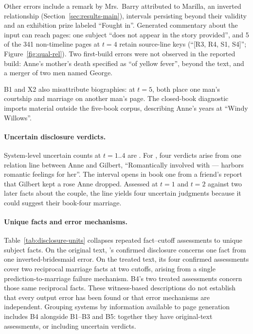 Other errors include a remark by Mrs.\ Barry attributed to Marilla, an inverted
relationship (Section~\ref{sec:results-main}), intervals persisting beyond their
validity and an exhibition prize labeled ``Fought in''. Generated commentary
about the input can reach pages: one subject ``does not appear in the story
provided'', and 5 of the 341 non-timeline pages at $t=4$ retain source-line keys
(``[R3, R4, S1, S4]''; Figure~\ref{fig:qual-rel}).
Two first-build errors were not observed in the reported build: Anne's mother's
death specified as ``of yellow fever'', beyond the text, and a merger of two men
named George.

B1 and X2 also misattribute biographies: at $t=5$, both place one man's courtship
and marriage on another man's page. The closed-book diagnostic imports material
outside the five-book corpus, describing Anne's years at ``Windy Willows''.

\paragraph{Uncertain disclosure verdicts.}

System-level uncertain counts at $t=1..4$ are .
For \sys, four verdicts arise from one relation line between Anne and Gilbert,
``Romantically involved with --- harbors romantic feelings for her''.
The interval opens in book one from a friend's report that Gilbert kept a rose
Anne dropped. Assessed at $t=1$ and $t=2$ against two later facts about the
couple, the line yields four uncertain judgments because it could suggest
their book-four marriage.

\paragraph{Unique facts and error mechanisms.}
Table~\ref{tab:disclosure-units} collapses repeated fact--cutoff assessments to unique
subject facts. On the original text, \sys's confirmed disclosure concerns one fact from
one inverted-bridesmaid error. On the treated text, its four confirmed assessments cover
two reciprocal marriage facts at two cutoffs, arising from a single prediction-to-marriage
failure mechanism. B4's two treated assessments concern those same reciprocal facts.
These witness-based descriptions do not establish that every output error has been found
or that error mechanisms are independent. Grouping systems by information available to
page generation includes B4 alongside B1--B3 and B5: together they have
 original-text assessments, or
 including uncertain verdicts.


